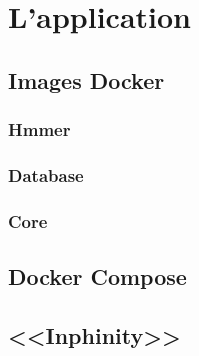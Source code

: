 \chapter{L'application}
\label{ch:app}

\section{Images Docker}
\subsection{Hmmer}
\subsection{Database}
\subsection{Core}

\section{Docker Compose}

\section{<<Inphinity>>}

